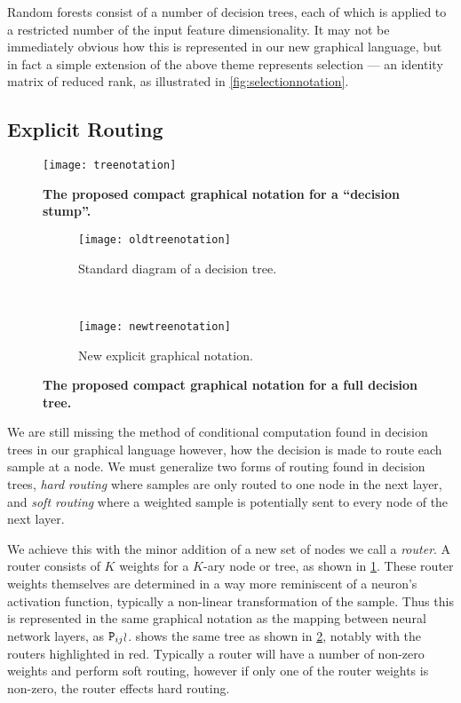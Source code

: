 \documentclass[thesis]{subfiles}
\begin{document}
	Random forests consist of a number of decision trees, each of which is applied to a restricted number of the input feature dimensionality. It may not be immediately obvious how this is represented in our new graphical language, but in fact a simple extension of the above theme represents selection --- \ie an identity matrix of reduced rank, as illustrated in \cref{fig:selectionnotation}.
	
	\subsection{Explicit Routing}
	\begin{figure}[htbp!] 
		\centering
		\texttt{[image: treenotation]}
		\caption[Proposed graphical notation for a decision stump.]{\textbf{The proposed compact graphical notation for a ``decision stump''.}}\label{fig:treeNotation}
	\end{figure}
	
	\begin{figure}[tbp] 
		\centering
		\begin{subfigure}[b]{0.4\textwidth}
			\centering
			\texttt{[image: oldtreenotation]}
			\caption{Standard diagram of a decision tree.}\label{fig:oldtreenotation}
		\end{subfigure}
		~
		\begin{subfigure}[b]{0.4\textwidth}
			\centering
			\texttt{[image: newtreenotation]}
			\caption{New explicit graphical notation.}\label{fig:newtreenotation}
		\end{subfigure}
		\caption[Proposed compact graphical notation for a decision tree.]{\textbf{The proposed compact graphical notation for a full decision tree.}}\label{fig:complexDecisionTree}
	\end{figure}
	
	We are still missing the method of conditional computation found in decision trees in our graphical language however, \ie how the decision is made to route each sample at a node. We must generalize two forms of routing found in decision trees, \emph{hard routing} where samples are only routed to one node in the next layer, and \emph{soft routing} where a weighted sample is potentially sent to every node of the next layer.
	
	We achieve this with the minor addition of a new set of nodes we call a \emph{router}. A router consists of $K$ weights for a $K$-ary node or tree, as shown in \cref{fig:treeNotation}. These router weights themselves are determined in a way more reminiscent of a neuron's activation function, typically a non-linear transformation of the sample. Thus this is represented in the same graphical notation as the mapping between neural network layers, \ie as $\mat P_{ij} \wr$.  shows the same tree as shown in \cref{fig:oldtreenotation}, notably with the routers highlighted in red. Typically a router will have a number of non-zero weights and perform soft routing, however if only one of the router weights is non-zero, the router effects hard routing.
	
\end{document}
